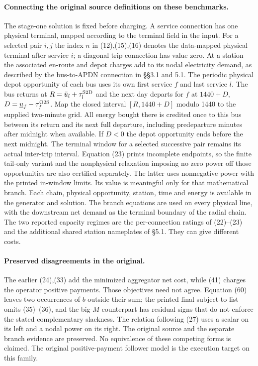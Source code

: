 \documentclass{article}
\begin{document}
\paragraph{Connecting the original source definitions on these benchmarks.}
The stage-one solution is fixed before charging. A service connection has
one physical terminal, mapped according to the terminal field in the input.
For a selected pair \(i,j\) the index \(n\) in (12),(15),(16) denotes
the data-mapped physical terminal after service \(i\); a diagonal trip
connection has value zero. At a station the associated en-route and depot charges add to its nodal
electricity demand, as described by the bus-to-APDN connection in §§3.1 and 5.1.
The periodic physical depot opportunity of each bus uses its own first
service \(f\) and last service \(l\). The bus returns at
\(R=\bar u_l+\tau^{\rm S2D}_l\) and the next day departs for \(f\) at
\(1440+D\), \(D=\underline u_f-\tau_f^{\rm O2S}\). Map the closed interval
\([R,1440+D]\) modulo 1440 to the supplied two-minute grid.
All energy bought there is credited once to this bus between its return and its
next full departure, including predeparture minutes after midnight when available.
If \(D<0\) the depot opportunity ends before the next midnight. The terminal
window for a selected successive pair remains its actual inter-trip interval.
Equation (23) prints incomplete endpoints, so the finite tail-only variant
and the nonphysical relaxation imposing no zero power off those opportunities are
also certified separately. The latter uses nonnegative power with the printed
in-window limits. Its value is meaningful only for that mathematical branch.
Each chain, physical opportunity, station, time and energy is available in the
generator and solution. The branch equations are used on every physical line,
with the downstream net demand as the terminal boundary of the radial chain.
The two reported capacity regimes are the per-connection ratings of (22)--(23)
and the additional shared station nameplates of §5.1. They can give different costs.

\paragraph{Preserved disagreements in the original.}
The earlier (24),(33) add the minimized aggregator net cost, while (41) charges
the operator positive payments. Those objectives need not agree. Equation (60)
leaves two occurrences of \(b\) outside their sum; the printed final subject-to
list omits (35)--(36), and the big-\(M\) counterpart has residual signs that do not
enforce the stated complementary slackness. The relation following (27) uses
a scalar on its left and a nodal power on its right. The original source and
the separate branch evidence are preserved. No equivalence of these competing
forms is claimed. The original positive-payment follower model is the execution
target on this family.
\end{document}
